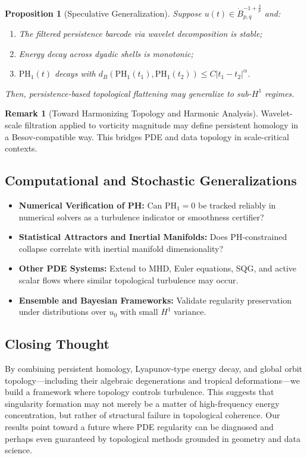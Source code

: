 \documentclass[11pt]{article}
\newtheorem{proposition}[theorem]{Proposition}
\theoremstyle{definition}
\newtheorem{remark}[theorem]{Remark}
\begin{document}
\begin{proposition}[Speculative Generalization]
Suppose $u(t) \in \dot{B}^{-1+\frac{3}{p}}_{p,q}$ and:
\begin{enumerate}
    \item The filtered persistence barcode via wavelet decomposition is stable;
    \item Energy decay across dyadic shells is monotonic;
    \item $\mathrm{PH}_1(t)$ decays with $d_B(\mathrm{PH}_1(t_1), \mathrm{PH}_1(t_2)) \le C|t_1 - t_2|^\alpha$.
\end{enumerate}
Then, persistence-based topological flattening may generalize to sub-$H^1$ regimes.
\end{proposition}

\begin{remark}[Toward Harmonizing Topology and Harmonic Analysis]
Wavelet-scale filtration applied to vorticity magnitude may define persistent homology in a Besov-compatible way. This bridges PDE and data topology in scale-critical contexts.
\end{remark}

\subsection*{Computational and Stochastic Generalizations}
\begin{itemize}
  \item \textbf{Numerical Verification of PH:} Can $\mathrm{PH}_1 = 0$ be tracked reliably in numerical solvers as a turbulence indicator or smoothness certifier?
  \item \textbf{Statistical Attractors and Inertial Manifolds:} Does PH-constrained collapse correlate with inertial manifold dimensionality?
  \item \textbf{Other PDE Systems:} Extend to MHD, Euler equations, SQG, and active scalar flows where similar topological turbulence may occur.
  \item \textbf{Ensemble and Bayesian Frameworks:} Validate regularity preservation under distributions over $u_0$ with small $H^1$ variance.
\end{itemize}

\subsection*{Closing Thought}
By combining persistent homology, Lyapunov-type energy decay, and global orbit topology—including their algebraic degenerations and tropical deformations—we build a framework where topology controls turbulence. This suggests that singularity formation may not merely be a matter of high-frequency energy concentration, but rather of structural failure in topological coherence. Our results point toward a future where PDE regularity can be diagnosed and perhaps even guaranteed by topological methods grounded in geometry and data science.
\end{document}
